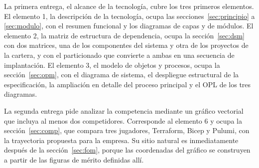 \documentclass[11pt,letterpaper]{article}
\begin{document}
La primera entrega, el alcance de la tecnología, cubre los tres primeros
elementos. El elemento 1, la descripción de la tecnología, ocupa las
secciones~\ref{sec:principio} a \ref{sec:modulo}, con el resumen funcional y
los diagramas de capas y de módulos. El elemento 2, la matriz de estructura de
dependencia, ocupa la sección~\ref{sec:dsm} con dos matrices, una de los
componentes del sistema y otra de los proyectos de la cartera, y con el
particionado que convierte a ambas en una secuencia de implantación. El
elemento 3, el modelo de objetos y procesos, ocupa la
sección~\ref{sec:opm}, con el diagrama de sistema, el despliegue estructural
de la especificación, la ampliación en detalle del proceso principal y el OPL
de los tres diagramas.

La segunda entrega pide analizar la competencia mediante un gráfico vectorial
que incluya al menos dos competidores. Corresponde al elemento 6 y ocupa la
sección~\ref{sec:comp}, que compara tres jugadores, Terraform, Bicep y
Pulumi, con la trayectoria propuesta para la empresa. Su sitio natural es
inmediatamente después de la sección~\ref{sec:fom}, porque las coordenadas del
gráfico se construyen a partir de las figuras de mérito definidas allí.
\end{document}
